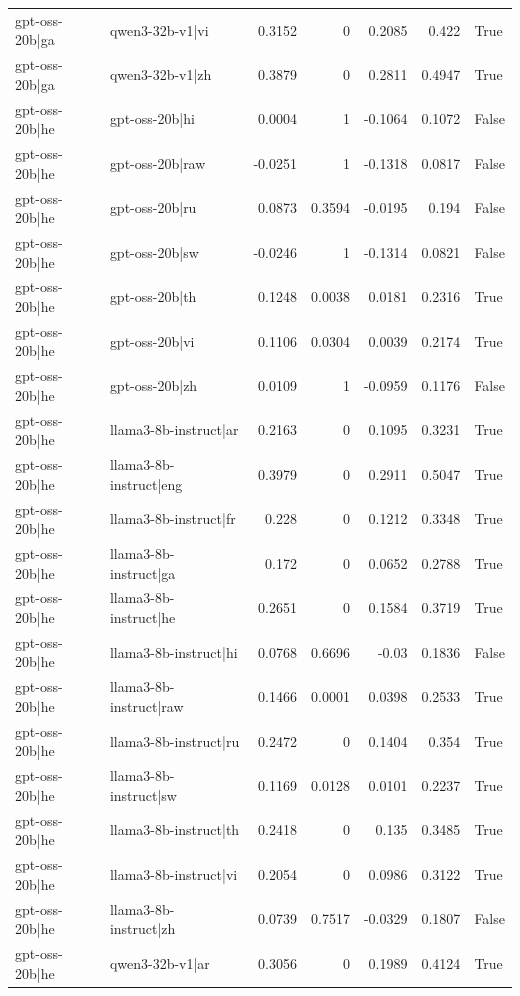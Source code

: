 \begin{table}
\begin{tabular}{l l r r r r l}
gpt-oss-20b|ga & qwen3-32b-v1|vi & 0.3152 & 0 & 0.2085 & 0.422 & True \\
gpt-oss-20b|ga & qwen3-32b-v1|zh & 0.3879 & 0 & 0.2811 & 0.4947 & True \\
gpt-oss-20b|he & gpt-oss-20b|hi & 0.0004 & 1 & -0.1064 & 0.1072 & False \\
gpt-oss-20b|he & gpt-oss-20b|raw & -0.0251 & 1 & -0.1318 & 0.0817 & False \\
gpt-oss-20b|he & gpt-oss-20b|ru & 0.0873 & 0.3594 & -0.0195 & 0.194 & False \\
gpt-oss-20b|he & gpt-oss-20b|sw & -0.0246 & 1 & -0.1314 & 0.0821 & False \\
gpt-oss-20b|he & gpt-oss-20b|th & 0.1248 & 0.0038 & 0.0181 & 0.2316 & True \\
gpt-oss-20b|he & gpt-oss-20b|vi & 0.1106 & 0.0304 & 0.0039 & 0.2174 & True \\
gpt-oss-20b|he & gpt-oss-20b|zh & 0.0109 & 1 & -0.0959 & 0.1176 & False \\
gpt-oss-20b|he & llama3-8b-instruct|ar & 0.2163 & 0 & 0.1095 & 0.3231 & True \\
gpt-oss-20b|he & llama3-8b-instruct|eng & 0.3979 & 0 & 0.2911 & 0.5047 & True \\
gpt-oss-20b|he & llama3-8b-instruct|fr & 0.228 & 0 & 0.1212 & 0.3348 & True \\
gpt-oss-20b|he & llama3-8b-instruct|ga & 0.172 & 0 & 0.0652 & 0.2788 & True \\
gpt-oss-20b|he & llama3-8b-instruct|he & 0.2651 & 0 & 0.1584 & 0.3719 & True \\
gpt-oss-20b|he & llama3-8b-instruct|hi & 0.0768 & 0.6696 & -0.03 & 0.1836 & False \\
gpt-oss-20b|he & llama3-8b-instruct|raw & 0.1466 & 0.0001 & 0.0398 & 0.2533 & True \\
gpt-oss-20b|he & llama3-8b-instruct|ru & 0.2472 & 0 & 0.1404 & 0.354 & True \\
gpt-oss-20b|he & llama3-8b-instruct|sw & 0.1169 & 0.0128 & 0.0101 & 0.2237 & True \\
gpt-oss-20b|he & llama3-8b-instruct|th & 0.2418 & 0 & 0.135 & 0.3485 & True \\
gpt-oss-20b|he & llama3-8b-instruct|vi & 0.2054 & 0 & 0.0986 & 0.3122 & True \\
gpt-oss-20b|he & llama3-8b-instruct|zh & 0.0739 & 0.7517 & -0.0329 & 0.1807 & False \\
gpt-oss-20b|he & qwen3-32b-v1|ar & 0.3056 & 0 & 0.1989 & 0.4124 & True \\

\end{tabular}
\end{table}
